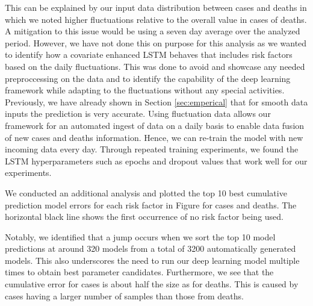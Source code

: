 \documentclass[a4paper, inpress]{jds} %
\renewcommand{\_}{%
    \textunderscore\hspace{0pt}%
}
\begin{document}
This can be explained by our input data distribution between cases and
deaths in which we noted higher fluctuations relative to the overall
value in cases of deaths.  A mitigation to this issue would be using a
seven day average over the analyzed period. However, we have not done
this on purpose for this analysis as we wanted to identify how a
covariate enhanced LSTM behaves that includes risk factors based on
the daily fluctuations. This was done to avoid and showcase any needed
preproccessing on the data and to identify the capability of the deep
learning framework while adapting to the fluctuations without any
special activities. Previously, we have already shown in Section
\ref{sec:emperical} that for smooth data inputs the prediction is very
accurate.  Using fluctuation data allows our framework for an
automated ingest of data on a daily basis to enable data fusion of new
cases and deaths information. Hence, we can re-train the model with
new incoming data every day. Through repeated training experiments, we
found the LSTM hyperparameters such as epochs and dropout values that
work well for our experiments.

We conducted an additional analysis and plotted the top 10 best
cumulative prediction model errors for each risk factor in
Figure \label{fig:place-top10} for cases and deaths.  The horizontal
black line shows the first occurrence of no risk factor being used.

Notably, we identified that a jump occurs when we sort the top 10
model predictions at around 320 models from a total of 3200
automatically generated models. This also underscores the need to run
our deep learning model multiple times to obtain best parameter
candidates.  Furthermore, we see that the cumulative error for cases
is about half the size as for deaths. This is caused by cases having a
larger number of samples than those from deaths.
\end{document}
